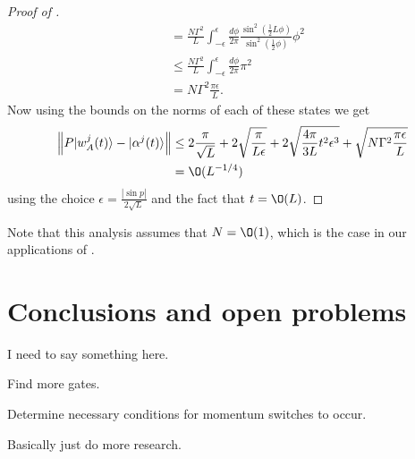\documentclass[../thesis-main/thesis-main]{subfiles}
\begin{document}
\begin{proof}[Proof of {}]
\begin{align*}
 & = \frac{N\Gamma^{2}}{L}\int_{-\epsilon}^{\epsilon}\frac{d\phi}{2\pi}\frac{\sin^{2}(\frac{1}{2}L\phi)}{\sin^{2}(\frac{1}{2}\phi)}\phi^{2}\\
 & \leq \frac{N\Gamma^{2}}{L}\int_{-\epsilon}^{\epsilon}\frac{d\phi}{2\pi}\pi^{2}\\
 & = N\Gamma^{2}\frac{\pi\epsilon}{L}.
\end{align*}
Now using the bounds on the norms of each of these states we get
\begin{align*}
\left\Vert P|w_{A}^{j}(t)\rangle-|\alpha^{j}(t)\rangle\right\Vert  & \leq 2\frac{\pi}{\sqrt{L}}+2\sqrt{\frac{\pi}{L\epsilon}}+2\sqrt{\frac{4\pi}{3L}t^{2}\epsilon^{3}}+\sqrt{N\Gamma^{2}\frac{\pi\epsilon}{L}}\\
 & = \O(L^{-{1}/{4}})
\end{align*}
using the choice $\epsilon=\frac{|{\sin p}|}{2\sqrt{L}}$ and the fact that $t = \O(L)$. 
\end{proof}

Note that this analysis assumes that $N = \O(1)$, which is the case in our applications of .



\section{Conclusions and open problems}

I need to say something here.

Find more gates.

Determine necessary conditions for momentum switches to occur.

Basically just do more research.

\biblio{}
\end{document}
